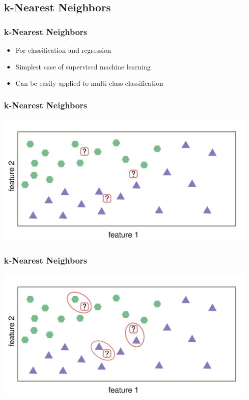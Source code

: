 \documentclass[aspectratio=169]{beamer}
\begin{document}
\begin{frame}{}
   \tableofcontents[currentsection]
\end{frame}

\subsection{k-Nearest Neighbors}

\begin{frame}
  \frametitle{k-Nearest Neighbors}
  \begin{block}{}
    \begin{center}
      \begin{itemize}
      \item For classification and regression
      \item Simplest case of supervised machine learning
      \item Can be easily applied to multi-class classification
      \end{itemize}
    \end{center}
  \end{block}    
\end{frame}

\begin{frame}
  \frametitle{k-Nearest Neighbors}
  \begin{center}
    \includegraphics[width=13.0cm]{images/k_nearest_neighbour_classification_only_training_data.pdf}
  \end{center}
\end{frame}

\begin{frame}
  \frametitle{k-Nearest Neighbors}
  \begin{center}
    \includegraphics[width=13.0cm]{images/k_nearest_neighbour_classification_k_1.pdf}
  \end{center}
\end{frame}
\end{document}
